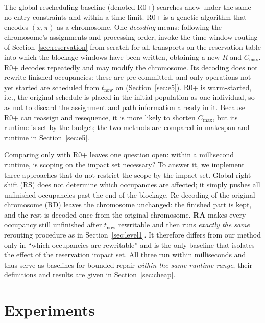 \documentclass[manuscript,screen,review]{acmart}
\begin{document}
The global rescheduling baseline (denoted R0+) searches anew under the same no-entry constraints and within a time limit.
R0+ is a genetic algorithm that encodes \((x,\pi)\) as a chromosome. One \emph{decoding} means: following the chromosome's assignments and processing order,
invoke the time-window routing of Section~\ref{sec:reservation} from scratch for all transports on the reservation table into which the blockage windows have been written,
obtaining a new \(R\) and \(C_{\max}\). R0+ decodes repeatedly and may modify the chromosome.
Its decoding does not rewrite finished occupancies: these are pre-committed, and only operations not yet started are scheduled from \(t_{\mathrm{now}}\) on (Section~\ref{sec:e5}).
R0+ is warm-started, i.e., the original schedule is placed in the initial population as one individual, so as not to discard the assignment and path information already in it.
Because R0+ can reassign and resequence, it is more likely to shorten \(C_{\max}\), but its runtime is set by the budget;
the two methods are compared in makespan and runtime in Section~\ref{sec:e5}.

Comparing only with R0+ leaves one question open: within a millisecond runtime, is scoping on the impact set necessary?
To answer it, we implement three approaches that do not restrict the scope by the impact set. Global right shift (RS) does not determine which occupancies
are affected; it simply pushes all unfinished occupancies past the end of the blockage. Re-decoding of the original chromosome (RD) leaves the chromosome unchanged:
the finished part is kept, and the rest is decoded once from the original chromosome.
\textbf{RA} makes every occupancy still unfinished after \(t_{\mathrm{now}}\) rewritable and then runs \emph{exactly the same} rerouting procedure as in Section~\ref{sec:level1}.
It therefore differs from our method only in ``which occupancies are rewritable'' and is the only baseline that isolates the effect of the reservation impact set.
All three run within milliseconds and thus serve as baselines for bounded repair \emph{within the same runtime range};
their definitions and results are given in Section~\ref{sec:cheap}.

\section{Experiments}
\label{sec:experiments}
\end{document}
